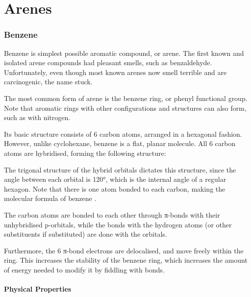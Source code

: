 

\pagebreak
\hypertarget{ChapterArenes}{}
\part{Arenes}

	\section{Benzene}

		Benzene is simplest possible aromatic compound, or arene. The first known and isolated arene compounds had pleasant smells,
		such as benzaldehyde. Unfortunately, even though most known arenes now smell terrible and are carcinogenic, the name stuck.


		The most common form of arene is the benzene ring, or phenyl functional group. Note that aromatic rings with other configurations
		and structures can also form, such as with nitrogen.

		Its basic structure consists of 6 carbon atoms, arranged in a hexagonal fashion. However, unlike cyclohexane, benzene is a flat,
		planar molecule. All 6 carbon atoms are \sptwo hybridised, forming the following structure:


		The trigonal structure of the \sptwo hybrid orbitals dictates this structure, since the angle between each orbital is \ang{120},
		which is the internal angle of a regular hexagon. Note that there is one  atom bonded to each carbon, making the molecular
		formula of benzene .

		The carbon atoms are bonded to each other through π-bonds with their unhybridised p-orbitals, while the bonds with the hydrogen
		atoms (or other substituents if substituted) are done with the \sptwo orbitals.

		Furthermore, the 6 π-bond electrons are delocalised, and move freely within the ring. This increases the stability of the benzene
		ring, which increases the amount of energy needed to modify it by fiddling with bonds.


		\subsection{Physical Properties}

